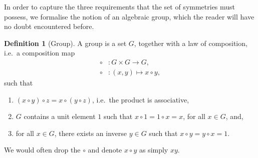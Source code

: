 \documentclass[a4 paper, 12pt]{book}
\theoremstyle{definition}
\newtheorem{definition}[theorem]{Definition}
\begin{document}
	In order to capture the three requirements that the set of symmetries must possess, we formalise the notion of an algebraic group, which the reader will have no doubt encountered before.
	\begin{definition}[Group]
	    A group is a set \(G\), together with a law of composition, i.e.\ a composition map
		\begin{align*}
		    \circ &\colon G \times G \rightarrow G,\\
			\circ &\colon (x, y) \mapsto x \circ y,
		\end{align*}
		such that
		\begin{enumerate}
		    \item \((x\circ y) \circ z = x\circ (y \circ z)\), i.e.\ the product is associative,
			\item \(G\) contains a unit element \(1\) such that \(x \circ 1 = 1 \circ x = x\), for all \(x \in G\), and,
			\item for all \(x\in G\), there exists an inverse \(y \in G\) such that \(x \circ y = y \circ x = 1\).
		\end{enumerate}
	\end{definition}
	\noindent We would often drop the \(\circ\) and denote \(x\circ y\) as simply \(xy\).
\end{document}
